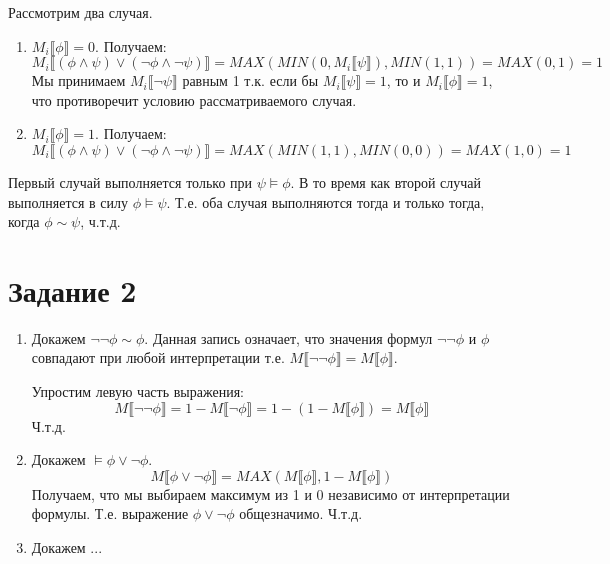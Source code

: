 \documentclass{article}
\begin{document}
\begin{enumerate}
        Рассмотрим два случая.
        \begin{enumerate}
            \item
                \(M_i\llbracket \phi \rrbracket = 0\). Получаем:
                \[
                    M_i\llbracket (\phi \land \psi) \lor (\neg \phi \land \neg \psi) \rrbracket
                    = MAX(MIN(0, M_i\llbracket\psi\rrbracket), MIN(1, 1))
                    = MAX(0, 1)
                    = 1
                \]
                Мы принимаем \(M_i\llbracket\neg\psi\rrbracket\) равным 1 т.к. 
                если бы \(M_i\llbracket\psi\rrbracket = 1\), то и \(M_i\llbracket\phi\rrbracket = 1\), 
                что противоречит условию рассматриваемого случая.
            \item
                \(M_i\llbracket \phi \rrbracket = 1\). Получаем:
                \[
                    M_i\llbracket (\phi \land \psi) \lor (\neg \phi \land \neg \psi) \rrbracket
                    = MAX(MIN(1, 1), MIN(0, 0))
                    = MAX(1, 0)
                    = 1
                \]
        \end{enumerate}

        Первый случай выполняется только при \(\psi \models \phi\).
        В то время как второй случай выполняется в силу \(\phi \models \psi\).
        Т.е. оба случая выполняются тогда и только тогда, когда \(\phi \sim \psi\), ч.т.д.
\end{enumerate}

\section*{Задание 2}
\begin{enumerate}
    \item
        Докажем \(\neg \neg \phi \sim \phi\). Данная запись означает, 
        что значения формул \(\neg \neg \phi\) и \(\phi\) совпадают при любой интерпретации 
        т.е. \(M\llbracket \neg \neg \phi\rrbracket = M\llbracket\phi\rrbracket\).

        Упростим левую часть выражения:
        \[
            M\llbracket\neg \neg \phi \rrbracket
            = 1 - M\llbracket \neg \phi \rrbracket
            = 1 - (1 - M\llbracket\phi\rrbracket)
            = M\llbracket\phi\rrbracket
        \]
        Ч.т.д.
    \item
        Докажем \(\models \phi \lor \neg \phi\).
        \[
            M\llbracket \phi \lor \neg \phi \rrbracket
            = MAX(M\llbracket \phi \rrbracket, 1 - M\llbracket \phi \rrbracket)
        \]
        Получаем, что мы выбираем максимум из 1 и 0 независимо от интерпретации формулы. 
        Т.е. выражение \(\phi \lor \neg \phi\) общезначимо. Ч.т.д.
    \item
        Докажем ...
\end{enumerate}
\end{document}
